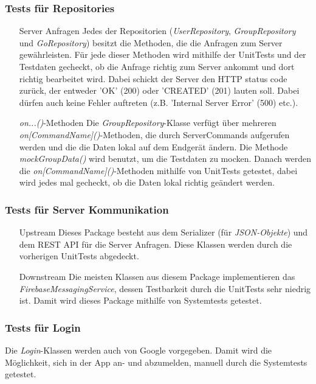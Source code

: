 \documentclass[11pt,a4paper]{scrartcl}
\begin{document}
\subsubsection{Tests für Repositories}
\begin{itemize}
	\item[Server Anfragen] Jedes der Repositorien (\textit{UserRepository}, \textit{GroupRepository} und \textit{GoRepository}) besitzt die Methoden, die die Anfragen zum Server gewährleisten. Für jede dieser Methoden wird mithilfe der UnitTests und der Testdaten gecheckt, ob die Anfrage richtig zum Server ankommt und dort richtig bearbeitet wird. Dabei schickt der Server den HTTP status code zurück, der entweder 'OK' (200) oder 'CREATED' (201) lauten soll. Dabei dürfen auch keine Fehler auftreten (z.B. 'Internal Server Error' (500) etc.).
	\item[\textit{on...()}-Methoden] Die \textit{GroupRepository}-Klasse verfügt über mehreren \textit{on[CommandName]()}-Methoden, die durch ServerCommands aufgerufen werden und die die Daten lokal auf dem Endgerät ändern. Die Methode \textit{mockGroupData()} wird benutzt, um die Testdaten zu mocken. Danach werden die \textit{on[CommandName]()}-Methoden mithilfe von UnitTests getestet, dabei wird jedes mal gecheckt, ob die Daten lokal richtig geändert werden.
\end{itemize}

\subsubsection{Tests für Server Kommunikation}
\begin{itemize}
	\item[Upstream] Dieses Package besteht aus dem Serializer (für \textit{JSON-Objekte}) und dem REST API für die Server Anfragen. Diese Klassen werden durch die vorherigen UnitTests abgedeckt.
	\item[Downstream] Die meisten Klassen aus diesem Package implementieren das \textit{FirebaseMessagingService}, dessen Testbarkeit durch die UnitTests sehr niedrig ist. Damit wird dieses Package mithilfe von Systemtests getestet.
\end{itemize}

\subsubsection{Tests für Login}
Die \textit{Login}-Klassen werden auch von Google vorgegeben. Damit wird die Möglichkeit, sich in der App an- und abzumelden, manuell durch die Systemtests getestet.
\end{document}

